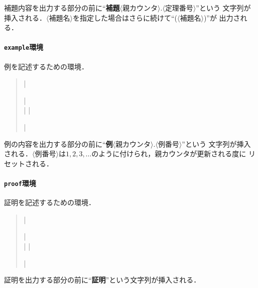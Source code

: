 \documentclass[a4paper,uplatex]{jsarticle}
\newcommand{\Meta}[1]{$\langle$\mbox{}#1\mbox{}$\rangle$}
\newenvironment{syntax}{\begin{quote}\small}{\end{quote}}
\begin{document}
補題内容を出力する部分の前に``\textbf{補題}\Meta{親カウンタ}.\Meta{定理番号}''という
文字列が挿入される．\Meta{補題名}を指定した場合はさらに続けて``(\Meta{補題名})''が
出力される．

\paragraph{\texttt{example}環境}\mbox{}\par
例を記述するための環境．
%
\begin{syntax}
|\begin{example}| \\
|%
|\end{example}|
\end{syntax}

例の内容を出力する部分の前に``\textbf{例}\Meta{親カウンタ}.\Meta{例番号}''という
文字列が挿入される．\Meta{例番号}は$1,2,3,\dots$のように付けられ，親カウンタが更新される度に
リセットされる．

\paragraph{\texttt{proof}環境}\mbox{}\par
証明を記述するための環境．
%
\begin{syntax}
|\begin{example}| \\
|%
|\end{example}|
\end{syntax}

証明を出力する部分の前に``\textbf{証明}''という文字列が挿入される．
\end{document}
